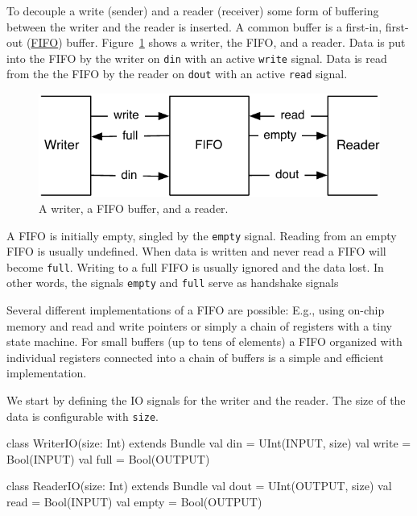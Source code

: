 \documentclass[%
    10pt, %
    headinclude, footexclude,
    openright, %
    notitlepage,
    cleardoubleempty,
    headsepline,
    pointlessnumbers,
    bibtotoc, idxtotoc,
    ]{scrbook}
\newcommand{\code}[1]{{\small{\texttt{#1}}}}
\begin{document}
To decouple a write (sender) and a reader (receiver) some form
of buffering between the writer and the reader is inserted.
A common buffer is a first-in, first-out
(\href{https://en.wikipedia.org/wiki/FIFO_%28computing_and_electronics%29}{FIFO})
buffer. Figure~\ref{fig:fifo} shows a writer, the FIFO, and a reader.
Data is put into the FIFO by the writer on \code{din} with an active
\code{write} signal. Data is read from the the FIFO by the reader on
\code{dout} with an active \code{read} signal.

\begin{figure}
  \centering
  \includegraphics{figures/fifo}

  \caption{A writer, a FIFO buffer, and a reader.}
  \label{fig:fifo}
\end{figure}

A FIFO is initially empty, singled by the \code{empty} signal. Reading
from an empty FIFO is usually undefined. When data is written and never
read a FIFO will become \code{full}. Writing to a full FIFO is usually ignored
and the data lost. In other words, the signals \code{empty} and \code{full}
serve as handshake signals 

Several different implementations of a FIFO are possible: E.g., using on-chip
memory and read and write pointers or simply a chain of registers with a
tiny state machine. For small buffers (up to tens of elements) a FIFO organized
with individual registers connected into a chain of buffers is a simple and efficient
implementation.

We start by defining the IO signals for the writer and the reader. The size of
the data is configurable with \code{size}.

\begin{chisel}
class WriterIO(size: Int) extends Bundle {
  val din = UInt(INPUT, size)
  val write = Bool(INPUT)
  val full = Bool(OUTPUT)
}

class ReaderIO(size: Int) extends Bundle {
  val dout = UInt(OUTPUT, size)
  val read = Bool(INPUT)
  val empty = Bool(OUTPUT)
}
\end{chisel}
\end{document}
